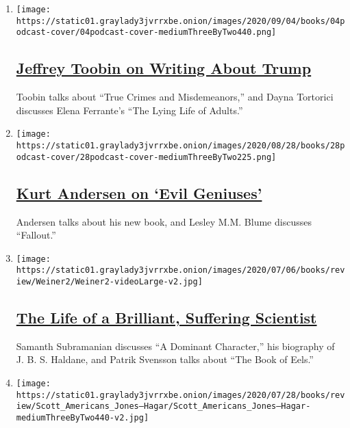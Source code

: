 \begin{enumerate}
\def\labelenumi{\arabic{enumi}.}
\item
  \texttt{[image: https://static01.graylady3jvrrxbe.onion/images/2020/09/04/books/04podcast-cover/04podcast-cover-mediumThreeByTwo440.png]}

  \hypertarget{jeffrey-toobin-on-writing-about-trump}{%
  \subsection{\texorpdfstring{\href{/2020/09/04/books/review/podcast-jeffrey-toobin-true-crimes-misdemeanors-trump-dayna-tortorici-elena-ferrante.html}{Jeffrey
  Toobin on Writing About
  Trump}}{Jeffrey Toobin on Writing About Trump}}\label{jeffrey-toobin-on-writing-about-trump}}

  Toobin talks about ``True Crimes and Misdemeanors,'' and Dayna
  Tortorici discusses Elena Ferrante's ``The Lying Life of Adults.''
\item
  \texttt{[image: https://static01.graylady3jvrrxbe.onion/images/2020/08/28/books/28podcast-cover/28podcast-cover-mediumThreeByTwo225.png]}

  \hypertarget{kurt-andersen-on-evil-geniuses}{%
  \subsection{\texorpdfstring{\href{/2020/08/28/books/review/podcast-evil-geniuses-kurt-andersen-fallout-hiroshima-lesley-m-m-blume.html}{Kurt
  Andersen on `Evil
  Geniuses'}}{Kurt Andersen on `Evil Geniuses'}}\label{kurt-andersen-on-evil-geniuses}}

  Andersen talks about his new book, and Lesley M.M. Blume discusses
  ``Fallout.''
\item
  \texttt{[image: https://static01.graylady3jvrrxbe.onion/images/2020/07/06/books/review/Weiner2/Weiner2-videoLarge-v2.jpg]}

  \hypertarget{the-life-of-a-brilliant-suffering-scientist}{%
  \subsection{\texorpdfstring{\href{/2020/08/21/books/review/podcast-Dominant-Character-Samanth-Subramanian-Book-of-Eels-Patrik-Svensson.html}{The
  Life of a Brilliant, Suffering
  Scientist}}{The Life of a Brilliant, Suffering Scientist}}\label{the-life-of-a-brilliant-suffering-scientist}}

  Samanth Subramanian discusses ``A Dominant Character,'' his biography
  of J. B. S. Haldane, and Patrik Svensson talks about ``The Book of
  Eels.''
\item
  \texttt{[image: https://static01.graylady3jvrrxbe.onion/images/2020/07/28/books/review/Scott\_Americans\_Jones--Hagar/Scott\_Americans\_Jones--Hagar-mediumThreeByTwo440-v2.jpg]}


\end{enumerate}
